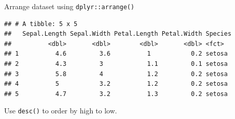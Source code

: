 \documentclass[14pt,ignorenonframetext,]{bredelebeamer}
\newenvironment{Shaded}{\begin{snugshade}}{\end{snugshade}}
\newcommand{\KeywordTok}[1]{\textcolor[rgb]{0.94,0.87,0.69}{#1}}
\newcommand{\DecValTok}[1]{\textcolor[rgb]{0.86,0.86,0.80}{#1}}
\newcommand{\StringTok}[1]{\textcolor[rgb]{0.80,0.58,0.58}{#1}}
\newcommand{\OperatorTok}[1]{\textcolor[rgb]{0.94,0.94,0.82}{#1}}
\newcommand{\NormalTok}[1]{\textcolor[rgb]{0.80,0.80,0.80}{#1}}
\begin{document}
\begin{frame}[fragile]{Arrange dataset using \texttt{dplyr::arrange()}}

\begin{Shaded}
\end{Shaded}

\begin{verbatim}
## # A tibble: 5 x 5
##   Sepal.Length Sepal.Width Petal.Length Petal.Width Species
##          <dbl>       <dbl>        <dbl>       <dbl> <fct>  
## 1          4.6         3.6          1           0.2 setosa 
## 2          4.3         3            1.1         0.1 setosa 
## 3          5.8         4            1.2         0.2 setosa 
## 4          5           3.2          1.2         0.2 setosa 
## 5          4.7         3.2          1.3         0.2 setosa
\end{verbatim}

\begin{Shaded}
\end{Shaded}

Use \texttt{desc()} to order by high to low.

\end{frame}
\end{document}
